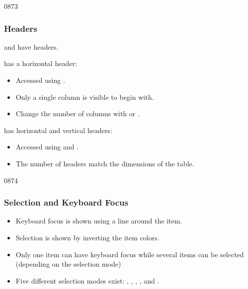 \begin{slide}{0873}\frametitle{Headers}

 and  have headers.

\vspace*{1em}
 has a horizontal header:
\begin{itemize}
\item Accessed using .
\item Only a single column is visible to begin with.
\item Change the number of columns with  or
.
\end{itemize}

\vspace*{0.5em}
 has horizontal and vertical headers:
\begin{itemize}
\item Accessed using 
and .
\item The number of headers match the dimensions of the table.
\end{itemize}
\end{slide}


\begin{slide}{0874}\frametitle{Selection and Keyboard Focus}
\begin{itemize}
\item Keyboard focus is shown using a line around the item.
\item Selection is shown by inverting the item colors.
\item Only one item can have keyboard focus while several items can be
  selected (depending on the selection mode)
\item Five different selection modes exist: ,
  , ,
  , and .
\end{itemize}
\end{slide}

